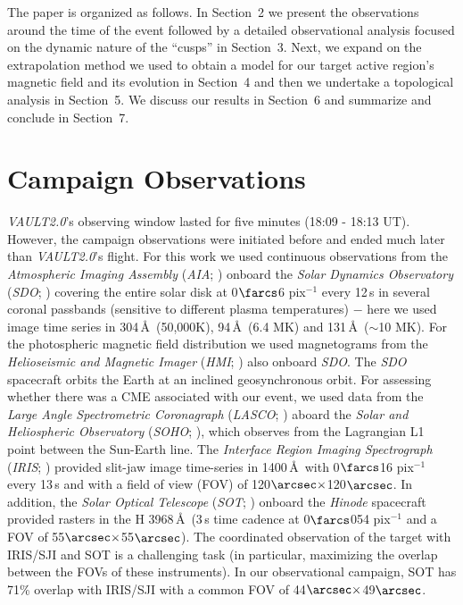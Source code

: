 \documentclass[preprint]{aastex}
\begin{document}
The paper is organized as follows. In Section~2 we present the observations around the time of the event followed by a detailed observational analysis focused on the dynamic nature of the ``cusps'' in Section~3. Next, we expand on the extrapolation method we used to obtain a model for our target active region's magnetic field and its evolution in Section~4 and then we undertake a topological analysis in Section~5. We discuss our results in Section~6 and summarize and conclude in Section~7. 



\section{Campaign Observations}
\textit{VAULT2.0}'s observing window lasted for five minutes (18:09 - 18:13 UT). However, the campaign observations were initiated before and ended much later than \emph{VAULT2.0}'s flight. For this work we used continuous observations from the \textit{Atmospheric Imaging Assembly} (\textit{AIA}; \citealt{Lemen_etal_2011}) onboard the \textit{Solar Dynamics Observatory} (\textit{SDO}; \citealt{Pesnell_etal_2012}) covering the entire solar disk at 0$\farcs$6 pix$^{-1}$ every 12\,s in several coronal passbands (sensitive to different plasma temperatures) $-$ here we used image time series in 304\,\AA\ (50,000K),  94\,\AA\ (6.4 MK) and 131\,\AA\ ($\sim$10 MK). For the photospheric magnetic field distribution we used magnetograms from the \textit{Helioseismic and Magnetic Imager} (\textit{HMI}; \citealt{Scherrer_etal_2012}) also onboard \textit{SDO}. The \textit{SDO} spacecraft orbits the Earth at an inclined geosynchronous orbit. For assessing whether there was a CME associated with our event, we used data from the \textit{Large Angle Spectrometric Coronagraph} (\textit{LASCO}; \citealt{Brueckner_etal_1995}) aboard the \textit{Solar and Heliospheric Observatory} (\textit{SOHO}; \citealt{Domingo_etal_1995}), which observes from the Lagrangian L1 point between the Sun-Earth line. The \textit{Interface Region Imaging Spectrograph} (\textit{IRIS}; \citealt{dePontieu_etal_2014}) provided slit-jaw image time-series in  1400\,\AA\ with 0$\farcs$16 pix$^{-1}$ every 13\,s and with a field of view (FOV) of 120$\arcsec\times$120$\arcsec$. In addition, the \textit{Solar Optical Telescope} (\textit{SOT}; \citealt{Tsuneta_etal_2008}) onboard the \textit{Hinode\/} spacecraft provided rasters in the  H 3968\,\AA\ (3\,s time cadence at 0$\farcs$054 pix$^{-1}$ and a FOV of 55$\arcsec\times$55$\arcsec$). The coordinated observation of the target with IRIS/SJI and SOT is a challenging task (in particular, maximizing the overlap between the FOVs of these instruments). In our observational campaign, SOT has 71\% overlap with IRIS/SJI with a common FOV of 44$\arcsec\times$49$\arcsec$. 
\end{document}
